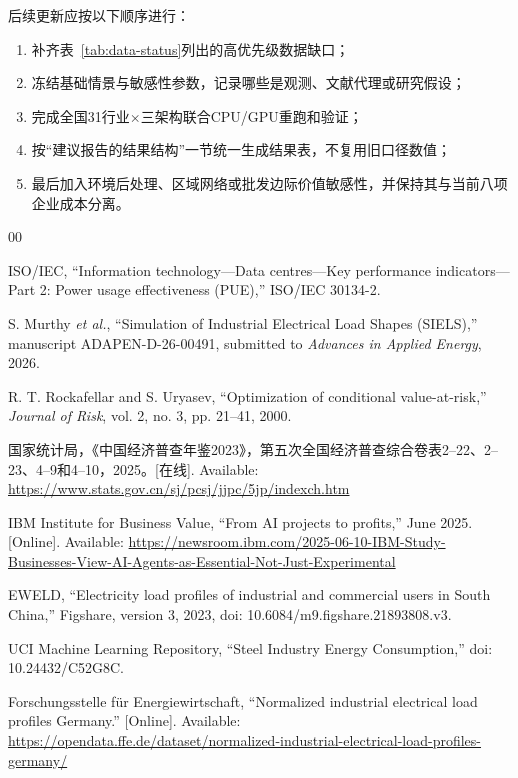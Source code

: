 \documentclass[preprint]{elsarticle}
\begin{document}
后续更新应按以下顺序进行：

\begin{enumerate}
  \item 补齐表~\ref{tab:data-status}列出的高优先级数据缺口；
  \item 冻结基础情景与敏感性参数，记录哪些是观测、文献代理或研究假设；
  \item 完成全国31行业$\times$三架构联合CPU/GPU重跑和验证；
  \item 按“建议报告的结果结构”一节统一生成结果表，不复用旧口径数值；
  \item 最后加入环境后处理、区域网络或批发边际价值敏感性，并保持其与当前八项企业成本分离。
\end{enumerate}

\begin{thebibliography}{00}

ISO/IEC, ``Information technology---Data centres---Key performance indicators---Part 2: Power usage effectiveness (PUE),'' ISO/IEC 30134-2.

S. Murthy \emph{et al.}, ``Simulation of Industrial Electrical Load Shapes (SIELS),'' manuscript ADAPEN-D-26-00491, submitted to \emph{Advances in Applied Energy}, 2026.

R. T. Rockafellar and S. Uryasev, ``Optimization of conditional value-at-risk,'' \emph{Journal of Risk}, vol. 2, no. 3, pp. 21--41, 2000.

国家统计局，《中国经济普查年鉴2023》，第五次全国经济普查综合卷表2--22、2--23、4--9和4--10，2025。[在线]. Available: \url{https://www.stats.gov.cn/sj/pcsj/jjpc/5jp/indexch.htm}

IBM Institute for Business Value, ``From AI projects to profits,'' June 2025. [Online]. Available: \url{https://newsroom.ibm.com/2025-06-10-IBM-Study-Businesses-View-AI-Agents-as-Essential-Not-Just-Experimental}

EWELD, ``Electricity load profiles of industrial and commercial users in South China,'' Figshare, version 3, 2023, doi: 10.6084/m9.figshare.21893808.v3.

UCI Machine Learning Repository, ``Steel Industry Energy Consumption,'' doi: 10.24432/C52G8C.

Forschungsstelle f\"ur Energiewirtschaft, ``Normalized industrial electrical load profiles Germany.'' [Online]. Available: \url{https://opendata.ffe.de/dataset/normalized-industrial-electrical-load-profiles-germany/}


\end{thebibliography}
\end{document}
